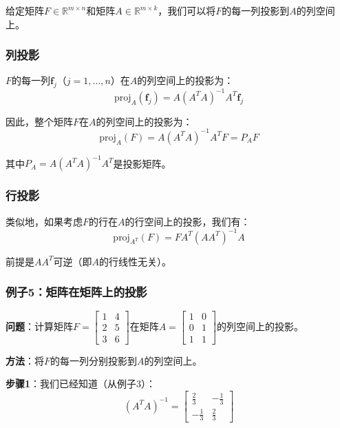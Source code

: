 \documentclass[12pt,a4paper]{article}
\begin{document}
给定矩阵$F \in \mathbb{R}^{m \times n}$和矩阵$A \in \mathbb{R}^{m \times k}$，我们可以将$F$的每一列投影到$A$的列空间上。

\subsubsection{列投影}

$F$的每一列$\bm{f}_j$（$j = 1, \ldots, n$）在$A$的列空间上的投影为：
\begin{equation}
\text{proj}_{A}(\bm{f}_j) = A (A^T A)^{-1} A^T \bm{f}_j
\end{equation}

因此，整个矩阵$F$在$A$的列空间上的投影为：
\begin{equation}
\text{proj}_{A}(F) = A (A^T A)^{-1} A^T F = P_A F
\label{eq:matrix_projection}
\end{equation}

其中$P_A = A (A^T A)^{-1} A^T$是投影矩阵。

\subsubsection{行投影}

类似地，如果考虑$F$的行在$A$的行空间上的投影，我们有：
\begin{equation}
\text{proj}_{A^T}(F) = F A^T (A A^T)^{-1} A
\label{eq:row_projection}
\end{equation}

前提是$A A^T$可逆（即$A$的行线性无关）。

\subsubsection{例子5：矩阵在矩阵上的投影}

\textbf{问题}：计算矩阵$F = \begin{bmatrix} 1 & 4 \\ 2 & 5 \\ 3 & 6 \end{bmatrix}$在矩阵$A = \begin{bmatrix} 1 & 0 \\ 0 & 1 \\ 1 & 1 \end{bmatrix}$的列空间上的投影。

\textbf{方法}：将$F$的每一列分别投影到$A$的列空间上。

\textbf{步骤1}：我们已经知道（从例子3）：
\begin{equation}
(A^T A)^{-1} = \begin{bmatrix} \frac{2}{3} & -\frac{1}{3} \\ -\frac{1}{3} & \frac{2}{3} \end{bmatrix}
\end{equation}
\end{document}
